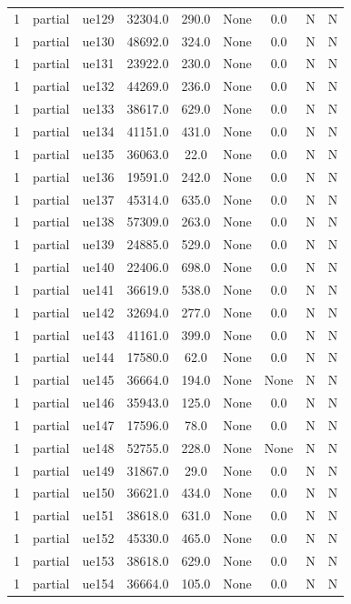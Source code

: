 \begin{table}[ht]
\begin{tabular}{|c|c|c|c|c|c|c|c|c|}
1 & partial & ue129 & 32304.0 & 290.0 & None & 0.0 & N & N \\
1 & partial & ue130 & 48692.0 & 324.0 & None & 0.0 & N & N \\
1 & partial & ue131 & 23922.0 & 230.0 & None & 0.0 & N & N \\
1 & partial & ue132 & 44269.0 & 236.0 & None & 0.0 & N & N \\
1 & partial & ue133 & 38617.0 & 629.0 & None & 0.0 & N & N \\
1 & partial & ue134 & 41151.0 & 431.0 & None & 0.0 & N & N \\
1 & partial & ue135 & 36063.0 & 22.0 & None & 0.0 & N & N \\
1 & partial & ue136 & 19591.0 & 242.0 & None & 0.0 & N & N \\
1 & partial & ue137 & 45314.0 & 635.0 & None & 0.0 & N & N \\
1 & partial & ue138 & 57309.0 & 263.0 & None & 0.0 & N & N \\
1 & partial & ue139 & 24885.0 & 529.0 & None & 0.0 & N & N \\
1 & partial & ue140 & 22406.0 & 698.0 & None & 0.0 & N & N \\
1 & partial & ue141 & 36619.0 & 538.0 & None & 0.0 & N & N \\
1 & partial & ue142 & 32694.0 & 277.0 & None & 0.0 & N & N \\
1 & partial & ue143 & 41161.0 & 399.0 & None & 0.0 & N & N \\
1 & partial & ue144 & 17580.0 & 62.0 & None & 0.0 & N & N \\
1 & partial & ue145 & 36664.0 & 194.0 & None & None & N & N \\
1 & partial & ue146 & 35943.0 & 125.0 & None & 0.0 & N & N \\
1 & partial & ue147 & 17596.0 & 78.0 & None & 0.0 & N & N \\
1 & partial & ue148 & 52755.0 & 228.0 & None & None & N & N \\
1 & partial & ue149 & 31867.0 & 29.0 & None & 0.0 & N & N \\
1 & partial & ue150 & 36621.0 & 434.0 & None & 0.0 & N & N \\
1 & partial & ue151 & 38618.0 & 631.0 & None & 0.0 & N & N \\
1 & partial & ue152 & 45330.0 & 465.0 & None & 0.0 & N & N \\
1 & partial & ue153 & 38618.0 & 629.0 & None & 0.0 & N & N \\
1 & partial & ue154 & 36664.0 & 105.0 & None & 0.0 & N & N \\

\end{tabular}
\end{table}
